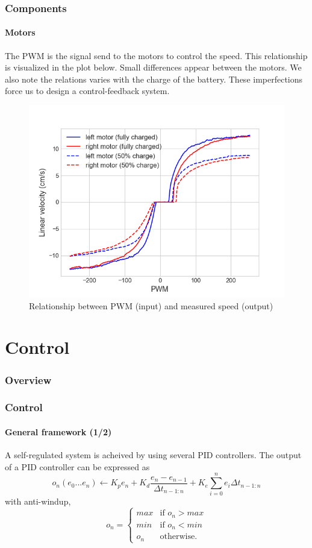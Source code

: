 \documentclass[10pt]{beamer}
\begin{document}
\begin{frame}
\frametitle{Components}
\framesubtitle{Motors}
The PWM is the signal send to the motors to control the speed. This relationship is visualized in the plot below. Small differences appear between the motors. We also note the relations varies with the charge of the battery. These imperfections force us to design a control-feedback system. 
\vspace*{-2mm}
\begin{figure}[hbtp]
\centering
\label{fig:pwm-speed}
\includegraphics[scale=0.45]{figures/motors_merged.png}
\vspace*{-2mm}
\caption{Relationship between PWM (input) and measured speed (output)}
\end{figure}
\end{frame}


\section{Control} 

\begin{frame}
\frametitle{Overview}
\tableofcontents[currentsection,subsectionstyle=shaded]
\end{frame}

\begin{frame}
\frametitle{Control}
\framesubtitle{General framework (1/2)}
A self-regulated system is acheived by using several PID controllers. The output of a PID controller can be expressed as
$$ 
o_n (e_0...e_n) \leftarrow K_p e_n + K_d\frac{e_n - e_{n-1}}{\Delta t_{n-1:n}} + K_e\sum_{i=0}^{n}{e_i \Delta t_{n-1:n}}
$$
with anti-windup,
$$
o_n = \left\{
    \begin{array}{ll}
        max & \mbox{if } o_n > max \\
        min & \mbox{if } o_n < min \\
        o_n & \mbox{otherwise.}
    \end{array}
\right.
$$
\end{frame}
\end{document}
